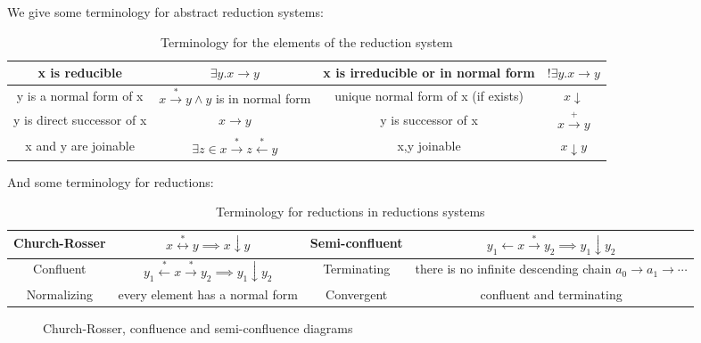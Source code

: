 We give some terminology for abstract reduction systems:

\begin{table}[H]
\centering
\begin{tabular}{|| c | c | c | c ||}
\hline
\hline 
x is reducible & $\exists y. x \to y$ & 
x is irreducible or in normal form  & $!\exists y. x \to y$ \\
\hline 
y is a normal form of x & $x \stackrel{*}{\rightarrow} y \land y$ is in normal form & unique normal form of x (if exists) & $x\downarrow$ \\
\hline 
y is direct successor of x & $x \to y$ &
y is successor of x & $x \stackrel{+}{\rightarrow} y$ \\
\hline 
x and y are joinable & $\exists z \in x \stackrel{*}{\rightarrow} z \stackrel{*}{\leftarrow} y$ & x,y joinable & $x \downarrow y$ \\
\hline
\end{tabular}
\caption{Terminology for the elements of the reduction system}
\label{table:notation2}
\end{table}


And some terminology for reductions:

\begin{table}[H]
\centering
\begin{adjustwidth}{-2cm}{}
\begin{tabular}{|| c | c | c | c ||}
\hline
\hline Church-Rosser & $x \stackrel{*}{\leftrightarrow} y \implies x \downarrow y$ & Semi-confluent & $y_1 \leftarrow x \stackrel{*}{\rightarrow} y_2 \implies y_1 \downarrow y_2$ \\
\hline Confluent & $y_1 \stackrel{*}{\leftarrow} x \stackrel{*}{\rightarrow} y_2 \implies y_1 \downarrow y_2$ & Terminating & there is no infinite descending chain $a_0 \to a_1 \to \cdots$ \\
\hline Normalizing & every element has a normal form & Convergent & confluent and terminating \\
\hline
\end{tabular}
\end{adjustwidth}
\caption{Terminology for reductions in reductions systems}
\label{table:notation3}
\end{table}

\begin{figure}[H]
\centering
{}
\caption{Church-Rosser, confluence and semi-confluence diagrams}
\end{figure}

